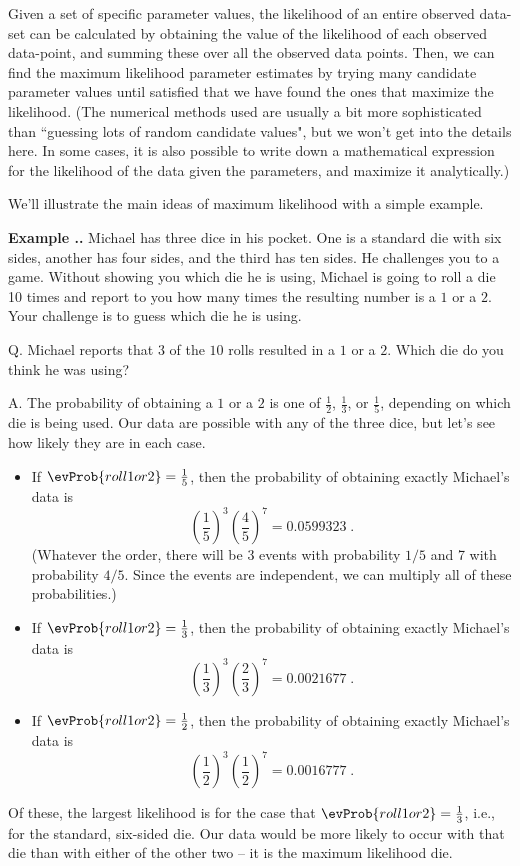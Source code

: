 \documentclass[twoside]{book}\usepackage[]{graphicx}\usepackage[]{xcolor}
\def\myindex#1{\index{#1}}
\def\question{{\sf Q. }}
\def\answer{{\sf A. }}
\newcounter{example}[section]
\newenvironment{example}%
{\refstepcounter{example}%
\textbf{Example \thesection.\arabic{example}. }}%
{}
\begin{document}
Given a set of specific parameter values, the likelihood of an entire observed data-set can be calculated by obtaining the value of the likelihood of each observed data-point, and summing these over all the observed data points.  Then, we can find the maximum likelihood parameter estimates by trying many candidate parameter values until satisfied that we have found the ones that maximize the likelihood. (The numerical methods used are usually a bit more sophisticated than ``guessing lots of random candidate values", but we won't get into the details here. In some cases, it is also possible to write down a mathematical expression for the likelihood of the data given the parameters, and maximize it analytically.)

We'll illustrate the main ideas of maximum likelihood with a simple example.

\begin{example}
\myindex{dice|exampleidx}%
Michael has three dice in his pocket.  One is a standard die with six sides,
another has four sides, and the third has ten sides.  He challenges you to a
game.  Without showing you which die he is using, Michael is going to roll a 
die 10 times and report to you how many times the resulting number is a 
$1$ or a $2$.  Your challenge is to guess which die he is using.

\question Michael reports that $3$ of the $10$ rolls resulted in a $1$ or a
$2$.  Which die do you think he was using?

\answer
The probability of obtaining a $1$ or a $2$ is one of $\frac12$,
$\frac13$, or $\frac15$, depending on which die is being used.  Our data
are possible with any of the three dice, but let's see how likely they are
in each case.

\begin{itemize}
\item
If $\evProb{roll 1 or 2}  = \frac15$, 
then the probability of obtaining exactly Michael's data is 
\[
\left(\frac15\right)^3 \left(\frac45\right)^7  
=  0.0599323
\;.
\]
(Whatever the order, there will be 3 events with probability
$1/5$ and 7 with probability $4/5$.  Since the events are independent,
we can multiply all of these probabilities.)
\item
If $\evProb{roll 1 or 2}  = \frac13$, 
then the probability of obtaining exactly Michael's data is 
\[
\left(\frac13\right)^3 \left(\frac23\right)^7 
=  0.0021677
\;.
\]
\item
If $\evProb{roll 1 or 2}  = \frac12$, 
then the probability of obtaining exactly Michael's data is 
\[
\left(\frac12\right)^3 \left(\frac12\right)^7 = 0.0016777
\;.
\]
\end{itemize}
Of these, the largest likelihood is for the case that 
$\evProb{roll 1 or 2}  = \frac13$, i.e.,
for the standard, six-sided die.  Our data would be more likely
to occur with that die than with either of the other two -- it is the 
maximum likelihood die.
\end{example}
\end{document}
